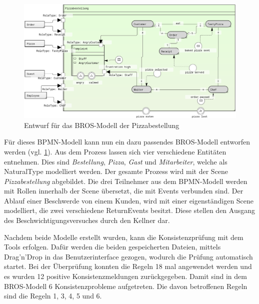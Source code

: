 \begin{figure}
    \centering
    \includegraphics[width=\textwidth,keepaspectratio]{../images/example/bros-rule1.png}%
    \caption{Entwurf für das BROS-Modell der Pizzabestellung}%
    \label{fig:pizzaBros1}
\end{figure}

Für dieses BPMN-Modell kann nun ein dazu passendes BROS-Modell entworfen werden (vgl. \cref{fig:pizzaBros1}).
Aus dem Prozess lassen sich vier verschiedene Entitäten entnehmen.
Dies sind \emph{Bestellung}, \emph{Pizza}, \emph{Gast} und \emph{Mitarbeiter}, welche als NaturalType modelliert werden.
Der gesamte Prozess wird mit der Scene \emph{Pizzabestellung} abgebildet.
Die drei Teilnehmer aus dem BPMN-Modell werden mit Rollen innerhalb der Scene übersetzt, die mit Events verbunden sind.
Der Ablauf einer Beschwerde von einem Kunden, wird mit einer eigenständigen Scene modelliert, die zwei verschiedene ReturnEvents besitzt.
Diese stellen den Ausgang des Beschwichtigungsversuches durch den Kellner dar.

Nachdem beide Modelle erstellt wurden, kann die Konsistenzprüfung mit dem Tools erfolgen.
Dafür werden die beiden gespeicherten Dateien, mittels Drag'n'Drop in das Benutzerinterface gezogen, wodurch die Prüfung automatisch startet.
Bei der Überprüfung konnten die Regeln 18 mal angewendet werden und es wurden 12 positive Konsistenzmeldungen zurückgegeben.
Damit sind in dem BROS-Modell 6 Konsistenzprobleme aufgetreten.
Die davon betroffenen Regeln sind die Regeln 1, 3, 4, 5 und 6.

